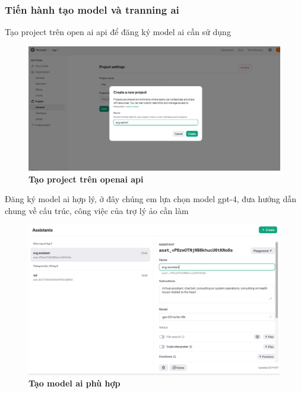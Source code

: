 \subsubsection{Tiến hành tạo model và tranning ai}
Tạo project trên open ai api để đăng ký model ai cần sử dụng 
\begin{figure}[H]
  \centering
  \includegraphics[scale=0.3]{Images/server/ai/create-project.png}
  \caption[Tạo project trên openai api]{\bfseries \fontsize{12pt}{0pt}
  \selectfont Tạo project trên openai api}
  \label{create-ai-project} %
\end{figure}

Đăng ký model ai hợp lý, ở đây chúng em lựa chọn model gpt-4, đưa hướng dẫn chung về cấu trúc, công việc của trợ lý ảo cần làm

\begin{figure}[H]
  \centering
  \includegraphics[scale=0.4]{Images/server/ai/create-assistant.png}
  \caption[Tạo model ai phù hợp]{\bfseries \fontsize{12pt}{0pt}
  \selectfont Tạo model ai phù hợp}
  \label{create-ai-assistant} %
\end{figure}

